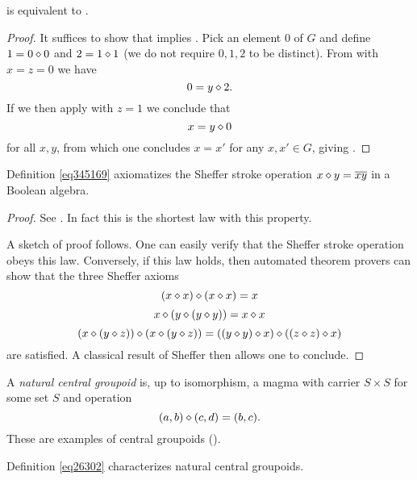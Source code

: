 \begin{theorem}[953 is equivalent to 2]\label{953_equiv_2}\leanok  {} is equivalent to .
\end{theorem}

\begin{proof}\leanok  It suffices to show that  implies .  Pick an element $0$ of $G$ and define $1 = 0 \diamond 0$ and $2 = 1 \diamond 1$ (we do not require $0,1,2$ to be distinct).
From  with $x=z=0$ we have
$$ 0 = y \diamond 2.$$
If we then apply  with $z=1$ we conclude that
$$ x = y \diamond 0$$
for all $x,y$, from which one concludes $x=x'$ for any $x,x' \in G$, giving .
\end{proof}


\begin{theorem}\label{sheffer}  Definition \ref{eq345169}
axiomatizes the Sheffer stroke operation $x \diamond y = \overline{xy}$ in a Boolean algebra.
\end{theorem}

\begin{proof}
See \cite{mccune_et_al}.  In fact this is the shortest law with this property.

A sketch of proof follows.  One can easily verify that the Sheffer stroke operation obeys this law.  Conversely, if this law holds, then automated theorem provers can show that the three Sheffer axioms
$$ (x \diamond x) \diamond (x \diamond x)  = x$$
$$ x \diamond (y \diamond (y \diamond y)) = x \diamond x$$
$$ (x \diamond (y \diamond z)) \diamond (x \diamond (y \diamond z)) = ((y \diamond y) \diamond x) \diamond ((z \diamond z) \diamond x)$$
are satisfied.  A classical result of Sheffer \cite{sheffer} then allows one to conclude.
\end{proof}

A \emph{natural central groupoid} is, up to isomorphism, a magma with carrier $S \times S$ for some set $S$ and operation
$$ (a,b) \diamond (c,d) = (b,c).$$
These are examples of central groupoids ().

\begin{theorem}\label{natural-central-groupoid}  Definition \ref{eq26302} characterizes natural central groupoids.
\end{theorem}

